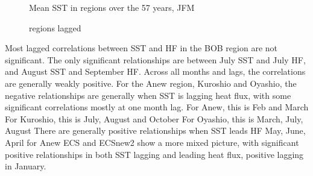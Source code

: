 \begin{figure} %
	
		 
	
	\caption{Mean SST in regions over the 57 years, JFM}\label{fig:region_sst_JFM}
\end{figure}


\begin{figure}

	\caption{regions lagged} \label{fig:regions lagged} 
\end{figure} 

Most lagged correlations between SST and HF in the BOB region are not significant. The only significant relationships are between July SST and July HF, and August SST and September HF. Across all months and lags, the correlations are generally weakly positive.
For the Anew region, Kuroshio and Oyashio, the negative relationships are generally when SST is lagging heat flux, with some significant correlations mostly at one month lag.
For Anew, this is Feb and March
For Kuroshio, this is July, August and October
For Oyashio, this is March, July, August
There are generally positive relationships when SST leads HF
May, June, April for Anew
ECS and ECSnew2 show a more mixed picture, with significant positive relationships in both SST lagging and leading heat flux, positive lagging in January.




